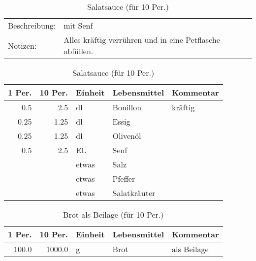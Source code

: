 \documentclass[11pt,a4paper]{article}%
\begin{document}
%
\vspace{0.75cm}%
\renewcommand{\arraystretch}{1.25}%


\begin{table}[h]%
\caption{Salatsauce (für 10 Per.)}%
\begin{tabularx}{\textwidth}{l X}%
Beschreibung: &mit Senf\\%
Notizen:&Alles kräftig verrühren und in eine Petflasche abfüllen.\\%
\end{tabularx}%
\par%
\begin{tabularx}{\textwidth}{| r | r | l | l | X |}%
\hline%
\tiny{1 Per.}&\tiny{10 Per.}&\tiny{Einheit}&\tiny{Lebensmittel}&\tiny{Kommentar}\\%
\hline%
0.5&2.5&dl&Bouillon&kräftig\\%
\hline%
0.25&1.25&dl&Essig&\\%
\hline%
0.25&1.25&dl&Olivenöl&\\%
\hline%
0.5&2.5&EL&Senf&\\%
\hline%
&&etwas&Salz&\\%
\hline%
&&etwas&Pfeffer&\\%
\hline%
&&etwas&Salatkräuter&\\%
\hline%
\end{tabularx}%
\end{table}

%
\vspace{0.75cm}%
\renewcommand{\arraystretch}{1.25}%


\begin{table}[h]%
\caption{Brot als Beilage (für 10 Per.)}%
\par%
\begin{tabularx}{\textwidth}{| r | r | l | l | X |}%
\hline%
\tiny{1 Per.}&\tiny{10 Per.}&\tiny{Einheit}&\tiny{Lebensmittel}&\tiny{Kommentar}\\%
\hline%
100.0&1000.0&g&Brot&als Beilage\\%
\hline%
\end{tabularx}%
\end{table}

%
\vspace{0.75cm}%
\renewcommand{\arraystretch}{1.25}%
\end{document}
